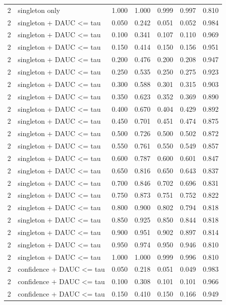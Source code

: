 \begin{tabular}{rlrrrrr}
2 & singleton only & 1.000 & 1.000 & 0.999 & 0.997 & 0.810 \\
2 & singleton + DAUC <= tau & 0.050 & 0.242 & 0.051 & 0.052 & 0.984 \\
2 & singleton + DAUC <= tau & 0.100 & 0.341 & 0.107 & 0.110 & 0.969 \\
2 & singleton + DAUC <= tau & 0.150 & 0.414 & 0.150 & 0.156 & 0.951 \\
2 & singleton + DAUC <= tau & 0.200 & 0.476 & 0.200 & 0.208 & 0.947 \\
2 & singleton + DAUC <= tau & 0.250 & 0.535 & 0.250 & 0.275 & 0.923 \\
2 & singleton + DAUC <= tau & 0.300 & 0.588 & 0.301 & 0.315 & 0.903 \\
2 & singleton + DAUC <= tau & 0.350 & 0.623 & 0.352 & 0.369 & 0.890 \\
2 & singleton + DAUC <= tau & 0.400 & 0.670 & 0.404 & 0.429 & 0.892 \\
2 & singleton + DAUC <= tau & 0.450 & 0.701 & 0.451 & 0.474 & 0.875 \\
2 & singleton + DAUC <= tau & 0.500 & 0.726 & 0.500 & 0.502 & 0.872 \\
2 & singleton + DAUC <= tau & 0.550 & 0.761 & 0.550 & 0.549 & 0.857 \\
2 & singleton + DAUC <= tau & 0.600 & 0.787 & 0.600 & 0.601 & 0.847 \\
2 & singleton + DAUC <= tau & 0.650 & 0.816 & 0.650 & 0.643 & 0.837 \\
2 & singleton + DAUC <= tau & 0.700 & 0.846 & 0.702 & 0.696 & 0.831 \\
2 & singleton + DAUC <= tau & 0.750 & 0.873 & 0.751 & 0.752 & 0.822 \\
2 & singleton + DAUC <= tau & 0.800 & 0.900 & 0.802 & 0.794 & 0.818 \\
2 & singleton + DAUC <= tau & 0.850 & 0.925 & 0.850 & 0.844 & 0.818 \\
2 & singleton + DAUC <= tau & 0.900 & 0.951 & 0.902 & 0.897 & 0.814 \\
2 & singleton + DAUC <= tau & 0.950 & 0.974 & 0.950 & 0.946 & 0.810 \\
2 & singleton + DAUC <= tau & 1.000 & 1.000 & 0.999 & 0.996 & 0.810 \\
2 & confidence + DAUC <= tau & 0.050 & 0.218 & 0.051 & 0.049 & 0.983 \\
2 & confidence + DAUC <= tau & 0.100 & 0.308 & 0.101 & 0.101 & 0.966 \\
2 & confidence + DAUC <= tau & 0.150 & 0.410 & 0.150 & 0.166 & 0.949 \\

\end{tabular}
